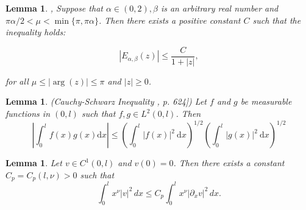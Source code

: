 \documentclass[reqno]{amsart}
\newtheorem{lem}[thm]{Lemma}
\theoremstyle{definition}
\numberwithin{equation}{section}
\begin{document}
\begin{lem}\label{Mittag} \cite{Podlubny},  Suppose that $\alpha \in(0,2), \beta$ is an arbitrary real number and $\pi \alpha / 2<\mu<\min \{\pi, \pi \alpha\}$. Then there exists a positive constant $C$ such that the inequality holds:

\begin{equation*}
    \left|E_{\alpha, \beta}(z)\right| \leq \frac{C}{1+|z|},
\end{equation*}

for all $\mu \leq|\arg (z)| \leq \pi$ and $|z| \geq 0$.
\end{lem}
\begin{lem} 
 (Cauchy-Schwarz Inequality \cite{Evans}, p. 624]) Let $f$ and $g$ be measurable functions in $(0,l)$ such that $f, g \in L^2(0,l)$. Then
\begin{equation*}
    \left|\int_{0}^l f(x) g(x) \mathrm{d} x\right| \leq\left(\int_{0}^l|f(x)|^2 \mathrm{~d} x\right)^{1 / 2}\left(\int_{0}^l|g(x)|^2 \mathrm{~d} x\right)^{1 / 2}
\end{equation*}
\end{lem}
\begin{lem}\label{poincare}
Let $v\in C^1(0,l)$ and $v(0)=0$. Then there exists a constant 
$C_p=C_p(l,\nu)>0$ such that
\begin{equation}
\int_{0}^l x^{\nu}|v|^2\,dx
\le C_p
\int_{0}^l x^{\nu}|\partial_x v|^2\,dx .
\end{equation}
\end{lem}
\end{document}
